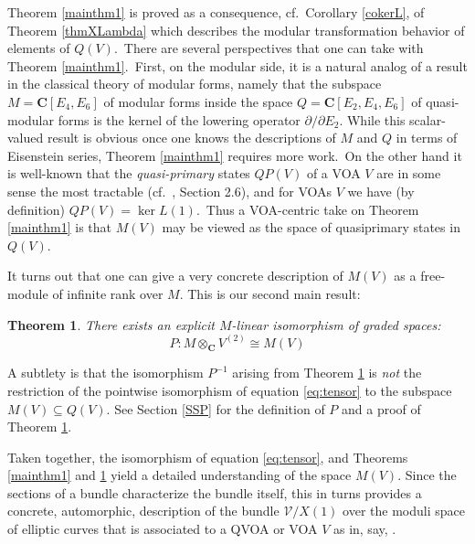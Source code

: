 \documentclass[12pt]{amsart}
\theoremstyle{plain}
\newtheorem{thm}{Theorem}[section]
\theoremstyle{definition}
\theoremstyle{remark}
\newcommand{\cV}{\mathcal{V}}
\newcommand{\CC}{\mathbf{C}}
\begin{document}
Theorem \ref{mainthm1} is proved as a consequence, cf.\ Corollary \ref{cokerL}, of Theorem \ref{thmXLambda} which describes the modular transformation behavior of elements of $Q(V)$.\ There are several perspectives that one can take with Theorem \ref{mainthm1}.\ First, on the modular side, it is a natural analog of a result in the classical theory of modular forms, namely that the subspace $M = \CC[E_4,E_6]$ of modular forms inside the space $Q= \CC[E_2,E_4,E_6]$ of quasi-modular forms is the kernel of the lowering operator $\partial/\partial E_2$. While this scalar-valued result is obvious once one knows the descriptions of $M$ and $Q$ in terms of Eisenstein series, Theorem \ref{mainthm1} requires more work.\ On the other hand it is well-known that the \textit{quasi-primary} states $QP(V)$ of a VOA $V$ are in some sense the most tractable (cf.\ \cite{FHL}, Section 2.6), and for VOAs $V$ we have (by definition) $QP(V)=\ker L(1)$.\ Thus a VOA-centric take on Theorem \ref{mainthm1} is that $M(V)$ may be viewed as the space of quasiprimary states in $Q(V)$.

It turns out that one can give a very concrete description of $M(V)$ as a free-module of infinite rank over $M$. This is our second main result:
\begin{thm}
    \label{mainthm2}
    There exists an explicit $M$-linear isomorphism of graded spaces:
    \[
    P\colon  M\otimes_{\CC} V^{(2)} \cong M(V)
    \]
\end{thm}
A subtlety is that the isomorphism $P^{-1}$ arising from Theorem \ref{mainthm2} is \emph{not} the restriction of the pointwise isomorphism of equation \eqref{eq:tensor} to the subspace $M(V) \subseteq Q(V)$. See Section \ref{SSP} for the definition of $P$ and a proof of Theorem \ref{mainthm2}.

Taken together, the isomorphism of equation \eqref{eq:tensor}, and Theorems \ref{mainthm1} and \ref{mainthm2} yield a detailed understanding of the space $M(V)$. Since the sections of a bundle characterize the bundle itself, this in turns provides a concrete, automorphic, description of the bundle $\cV/X(1)$ over the moduli space of elliptic curves that is associated to a QVOA or VOA $V$ as in, say, \cite{FBZ}.
\end{document}
